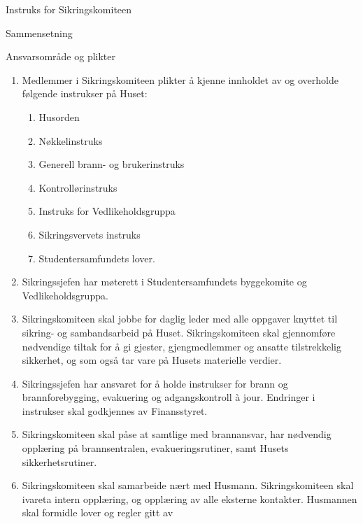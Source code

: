 \begin{instruks*}{Instruks for Sikringskomiteen}
\begin{instruksledd}{Sammensetning}
\begin{enumerate}
	
        \end{enumerate}
    \end{instruksledd}

    \begin{instruksledd}{Ansvarsområde og plikter}
        \begin{enumerate}
            \item Medlemmer i Sikringskomiteen plikter å kjenne innholdet av og overholde
                følgende instrukser på Huset:
                \begin{enumerate}
                    \item Husorden
		    \item Nøkkelinstruks
                    \item Generell brann- og brukerinstruks 
                    \item Kontrollørinstruks
                    \item Instruks for Vedlikeholdsgruppa
                    \item Sikringsvervets instruks
                    \item Studentersamfundets lover.
                \end{enumerate}
            \item Sikringssjefen har møterett i Studentersamfundets byggekomite og
                Vedlikeholdsgruppa.
            \item Sikringskomiteen skal jobbe for daglig leder med alle oppgaver knyttet
                til sikring- og sambandsarbeid på Huset.
                Sikringskomiteen skal gjennomføre nødvendige tiltak for å gi gjester,
                gjengmedlemmer og ansatte
                tilstrekkelig sikkerhet, og som også tar vare på Husets materielle
                verdier.
            \item Sikringssjefen har ansvaret for å holde instrukser for brann og
                brannforebygging, evakuering og
                adgangskontroll à jour. Endringer i instrukser skal godkjennes av
                Finansstyret.
            \item Sikringskomiteen skal påse at samtlige med brannansvar, har nødvendig
                opplæring på brannsentralen,
                evakueringsrutiner, samt Husets sikkerhetsrutiner.
            \item Sikringskomiteen skal samarbeide nært med Husmann. Sikringskomiteen skal ivareta
                intern opplæring, og opplæring av alle eksterne kontakter. Husmannen skal
                formidle lover og regler gitt av

\end{enumerate}
\end{instruksledd}
\end{instruks*}
